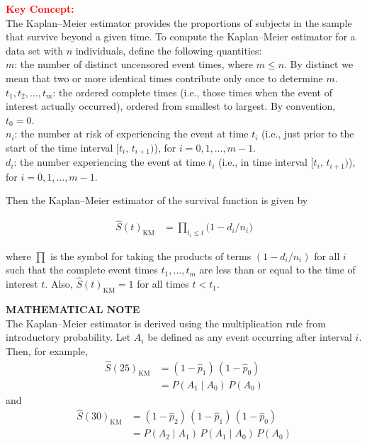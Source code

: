 \documentclass[
]{report}
\begin{document}
\textbf{\textcolor{red}{Key Concept:}}\\
\color{red}
The Kaplan--Meier estimator provides the proportions of subjects in the sample that survive beyond a given time. To compute the Kaplan--Meier estimator for a data set with \(n\) individuals, define the following quantities:\\
\(m\): the number of distinct uncensored event times, where \(m \le n\). By distinct we mean that two or more identical times contribute only once to determine \(m\).\\
\(t_1, t_2, \dots, t_m\): the ordered complete times (i.e., those times when the event of interest actually occurred), ordered from smallest to largest. By convention, \(t_0 = 0\).\\
\(n_i\): the number at risk of experiencing the event at time \(t_i\) (i.e., just prior to the start of the time interval \([t_i,\,t_{i+1})\)), for \(i = 0,1,\dots,m-1\).\\
\(d_i\): the number experiencing the event at time \(t_i\) (i.e., in time interval \([t_i,\,t_{i+1})\)), for \(i = 0,1,\dots,m-1\).

Then the Kaplan--Meier estimator of the survival function is given by

\begin{align}\label{9.2}
\hat S(t)_{\mathrm{KM}} &= \prod_{t_i \le t} \bigl(1 - d_i/n_i\bigr)
\tag{9.2}
\end{align}

where \(\prod\) is the symbol for taking the products of terms \((1 - d_i/n_i)\) for all \(i\) such that the complete event times \(t_1,\dots,t_m\) are less than or equal to the time of interest \(t\). Also, \(\hat S(t)_{\mathrm{KM}} = 1\) for all times \(t < t_1\).
\color{black}
\normalsize

\large

\textbf{MATHEMATICAL NOTE}\\
The Kaplan--Meier estimator is derived using the multiplication rule from introductory probability. Let \(A_i\) be defined as any event occurring after interval \(i\). Then, for example,
\begin{align}
\hat S(25)_{\mathrm{KM}} &= (1 - \hat p_1)\,(1 - \hat p_0) \\
&= P(A_1 \mid A_0)\,P(A_0)
\end{align}
and
\begin{align}
\hat S(30)_{\mathrm{KM}} &= (1 - \hat p_2)\,(1 - \hat p_1)\,(1 - \hat p_0) \\
&= P(A_2 \mid A_1)\,P(A_1 \mid A_0)\,P(A_0)
\end{align}
\normalsize
\end{document}
